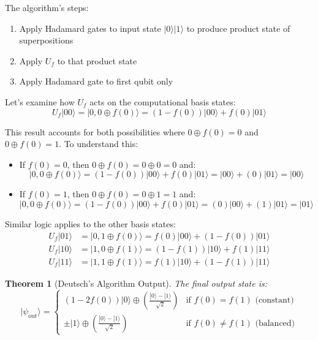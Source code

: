\documentclass{article}
\newtheorem{theorem}{Theorem}[subsection]
\begin{document}
The algorithm's steps:
\begin{enumerate}
    \item Apply Hadamard gates to input state $|0\rangle|1\rangle$ to produce product state of superpositions
    \item Apply $U_f$ to that product state
    \item Apply Hadamard gate to first qubit only
\end{enumerate}

\begin{conceptbox}
Let's examine how $U_f$ acts on the computational basis states:
\[
U_f|00\rangle = |0, 0 \oplus f(0)\rangle = (1-f(0))|00\rangle + f(0)|01\rangle
\]

This result accounts for both possibilities where $0 \oplus f(0) = 0$ and $0 \oplus f(0) = 1$. To understand this:
\begin{itemize}
    \item If $f(0) = 0$, then $0 \oplus f(0) = 0 \oplus 0 = 0$ and:
    \[
    |0, 0 \oplus f(0)\rangle = (1-f(0))|00\rangle + f(0)|01\rangle = |00\rangle + (0)|01\rangle = |00\rangle
    \]
    \item If $f(0) = 1$, then $0 \oplus f(0) = 0 \oplus 1 = 1$ and:
    \[
    |0, 0 \oplus f(0)\rangle = (1-f(0))|00\rangle + f(0)|01\rangle = (0)|00\rangle + (1)|01\rangle = |01\rangle
    \]
\end{itemize}

Similar logic applies to the other basis states:
\begin{align*}
U_f|01\rangle &= |0, 1 \oplus f(0)\rangle = f(0)|00\rangle + (1-f(0))|01\rangle \\
U_f|10\rangle &= |1, 0 \oplus f(1)\rangle = (1-f(1))|10\rangle + f(1)|11\rangle \\
U_f|11\rangle &= |1, 1 \oplus f(1)\rangle = f(1)|10\rangle + (1-f(1))|11\rangle
\end{align*}
\end{conceptbox}

\begin{theorem}[Deutsch's Algorithm Output]
The final output state is:
\[
|\psi_{\text{out}}\rangle = \begin{cases}
(1-2f(0))|0\rangle\oplus\left(\frac{|0\rangle - |1\rangle}{\sqrt{2}}\right) & \text{if } f(0) = f(1) \text{ (constant)} \\
\pm|1\rangle\oplus\left(\frac{|0\rangle - |1\rangle}{\sqrt{2}}\right) & \text{if } f(0) \neq f(1) \text{ (balanced)}
\end{cases}
\]
\end{theorem}
\end{document}
